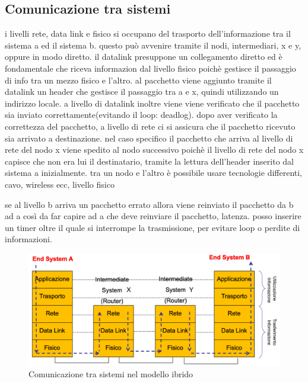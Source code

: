 \subsection{Comunicazione tra sistemi}
i livelli rete, data link e fisico si occupano del trasporto dell’informazione tra il sistema a ed il sistema b. questo può avvenire tramite il nodi, intermediari, x e y, oppure in modo diretto.
il datalink presuppone un collegamento diretto ed è fondamentale che riceva informazion dal livello fisico poichè gestisce il passaggio di info tra un mezzo fisico e l’altro. al pacchetto viene aggiunto tramite il datalink un header che gestisce il passaggio tra a e x, quindi utilizzando un indirizzo locale. a livello di datalink inoltre viene viene verificato che il pacchetto sia inviato correttamente(evitando il loop: deadlog). dopo aver verificato la correttezza del pacchetto, a livello di rete ci si assicura che il pacchetto ricevuto sia arrivato a destinazione. nel caso specifico il pacchetto che arriva al livello di rete del nodo x viene spedito al nodo successivo poichè il livello di rete del nodo x capisce che non era lui il destinatario, tramite la lettura dell’header inserito dal sistema a inizialmente. 
tra un nodo e l’altro è possibile usare tecnologie differenti, cavo, wireless ecc, livello fisico

se al livello b arriva un pacchetto errato allora viene reinviato il pacchetto da b ad a così da far capire ad a che deve reinviare il pacchetto, latenza.
posso inserire un timer oltre il quale si interrompe la trasmissione, per evitare loop o perdite di informazioni.

\begin{figure}[h!]
    \centering
    \includegraphics[width=1\textwidth]{images/comunicazione_ibrido.png}
    \caption{Comunicazione tra sistemi nel modello ibrido}
    \label{fig:comunicazione_sistemi_ibrido}
\end{figure}


